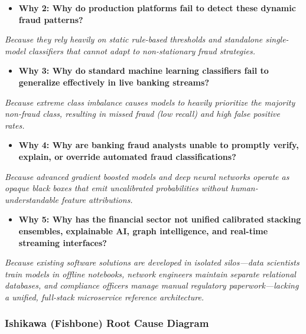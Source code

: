 \documentclass[12pt,a4paper,oneside]{report}
\begin{document}
\begin{itemize}[leftmargin=0.35in]
\item \textbf{Why 2: Why do production platforms fail to detect these dynamic fraud patterns?}
\end{itemize}
\textit{Because they rely heavily on static rule-based thresholds and standalone single-model classifiers that cannot adapt to non-stationary fraud strategies.}

\begin{itemize}[leftmargin=0.35in]
\item \textbf{Why 3: Why do standard machine learning classifiers fail to generalize effectively in live banking streams?}
\end{itemize}
\textit{Because extreme class imbalance causes models to heavily prioritize the majority non-fraud class, resulting in missed fraud (low recall) and high false positive rates.}

\begin{itemize}[leftmargin=0.35in]
\item \textbf{Why 4: Why are banking fraud analysts unable to promptly verify, explain, or override automated fraud classifications?}
\end{itemize}
\textit{Because advanced gradient boosted models and deep neural networks operate as opaque black boxes that emit uncalibrated probabilities without human-understandable feature attributions.}

\begin{itemize}[leftmargin=0.35in]
\item \textbf{Why 5: Why has the financial sector not unified calibrated stacking ensembles, explainable AI, graph intelligence, and real-time streaming interfaces?}
\end{itemize}
\textit{Because existing software solutions are developed in isolated silos---data scientists train models in offline notebooks, network engineers maintain separate relational databases, and compliance officers manage manual regulatory paperwork---lacking a unified, full-stack microservice reference architecture.}


\subsubsection{Ishikawa (Fishbone) Root Cause Diagram}
\end{document}
